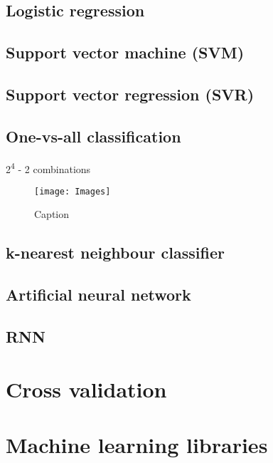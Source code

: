 \documentclass[12pt]{article}
\begin{document}
\subsection{Logistic regression}
\subsection{Support vector machine (SVM)}
\subsection{Support vector regression (SVR)}
\subsection{One-vs-all classification}
2\textsuperscript{4} - 2 combinations
\begin{figure}
    \centering
    \texttt{[image: Images]}
    \caption{Caption}
    \label{fig:1vAll}
\end{figure}
\subsection{k-nearest neighbour classifier}
\subsection{Artificial neural network}
\subsection{RNN}

\section{Cross validation}
\subsection{}

\section{Machine learning libraries}

\newpage


\end{document}
